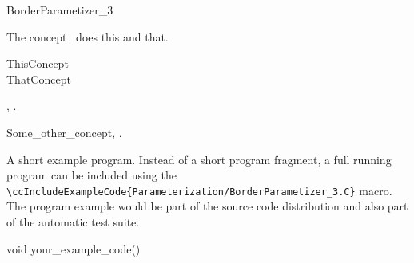 

\begin{ccRefConcept}{BorderParametizer_3}


\ccDefinition

The concept \ccRefName\ does this and that.

\ccGeneralizes

ThisConcept \\
ThatConcept

\ccTypes


\ccCreation
{}  %


\ccOperations


\ccHasModels

,
.

\ccSeeAlso

Some\_other\_concept,
.

\ccExample

A short example program.
Instead of a short program fragment, a full running program can be
included using the
\verb|\ccIncludeExampleCode{Parameterization/BorderParametizer_3.C}|
macro. The program example would be part of the source code distribution and
also part of the automatic test suite.

\begin{ccExampleCode}
void your_example_code() {
}
\end{ccExampleCode}


\end{ccRefConcept}


